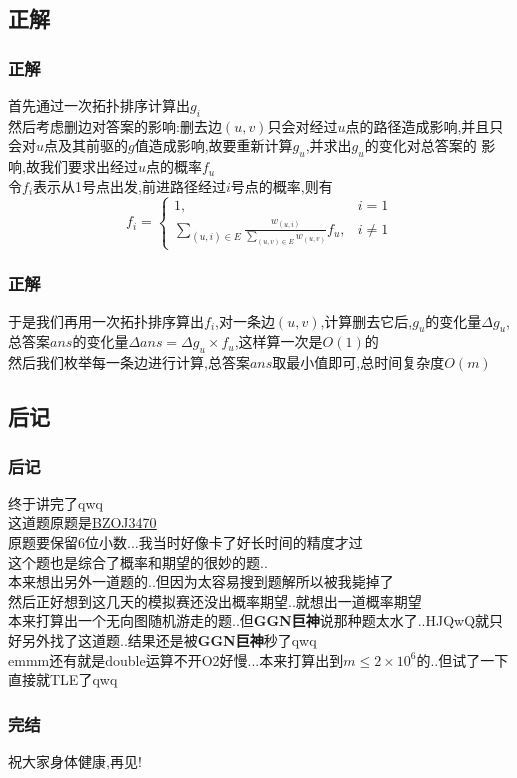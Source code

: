 \documentclass{beamer}
\begin{document}
		\subsection{正解}
			\begin{frame}\frametitle{正解}
				首先通过一次拓扑排序计算出$g_i$\\
				然后考虑删边对答案的影响:删去边$(u,v)$只会对经过$u$点的路径造成影响,并且只会对$u$点及其前驱的$g$值造成影响,故要重新计算$g_u$,并求出$g_u$的变化对总答案的
				影响,故我们要求出经过$u$点的概率$f_u$\\
				令$f_i$表示从1号点出发,前进路径经过$i$号点的概率,则有\\
				$$f_i=\begin{cases}
					1,&i=1\\
					\sum\limits_{(u,i)\in E}\frac{w_{(u,i)}}{\sum\limits_{(u,v)\in E}w_{(u,v)}}f_u,&i\neq1
				\end{cases}$$
			\end{frame}
			\begin{frame}\frametitle{正解}
				于是我们再用一次拓扑排序算出$f_i$,对一条边$(u,v)$,计算删去它后,$g_u$的变化量$\Delta g_u$,总答案$ans$的变化量$\Delta ans=\Delta g_u\times f_u$,这样算一次是$O(1)$的\\
				然后我们枚举每一条边进行计算,总答案$ans$取最小值即可,总时间复杂度$O(m)$
			\end{frame}
		\subsection{后记}
			\begin{frame}\frametitle{后记}
				终于讲完了qwq\\
				这道题原题是\underline{\href{https://darkbzoj.tk/problem/3470}{BZOJ3470}}\\
				原题要保留6位小数...我当时好像卡了好长时间的精度才过\\
				这个题也是综合了概率和期望的很妙的题..\\
				本来想出另外一道题的..但因为太容易搜到题解所以被我毙掉了\\
				然后正好想到这几天的模拟赛还没出概率期望..就想出一道概率期望\\
				本来打算出一个无向图随机游走的题..但\textbf{GGN巨神}说那种题太水了..HJQwQ就只好另外找了这道题..结果还是被\textbf{GGN巨神}秒了qwq\\
				emmm还有就是double运算不开O2好慢...本来打算出到$m\le2\times10^6$的..但试了一下直接就TLE了qwq
			\end{frame}
			\begin{frame}\frametitle{完结}
				祝大家身体健康,再见!
			\end{frame}
\end{document}
